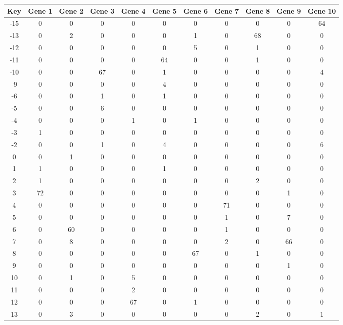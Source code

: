 \begin{tabular}{|c|c|c|c|c|c|c|c|c|c|c|}
\hline
Key & Gene 1 & Gene 2 & Gene 3 & Gene 4 & Gene 5 & Gene 6 & Gene 7 & Gene 8 & Gene 9 & Gene 10 \\
\hline
-15 & 0 & 0 & 0 & 0 & 0 & 0 & 0 & 0 & 0 & 64 \\
-13 & 0 & 2 & 0 & 0 & 0 & 1 & 0 & 68 & 0 & 0 \\
-12 & 0 & 0 & 0 & 0 & 0 & 5 & 0 & 1 & 0 & 0 \\
-11 & 0 & 0 & 0 & 0 & 64 & 0 & 0 & 1 & 0 & 0 \\
-10 & 0 & 0 & 67 & 0 & 1 & 0 & 0 & 0 & 0 & 4 \\
-9 & 0 & 0 & 0 & 0 & 4 & 0 & 0 & 0 & 0 & 0 \\
-6 & 0 & 0 & 1 & 0 & 1 & 0 & 0 & 0 & 0 & 0 \\
-5 & 0 & 0 & 6 & 0 & 0 & 0 & 0 & 0 & 0 & 0 \\
-4 & 0 & 0 & 0 & 1 & 0 & 1 & 0 & 0 & 0 & 0 \\
-3 & 1 & 0 & 0 & 0 & 0 & 0 & 0 & 0 & 0 & 0 \\
-2 & 0 & 0 & 1 & 0 & 4 & 0 & 0 & 0 & 0 & 6 \\
0 & 0 & 1 & 0 & 0 & 0 & 0 & 0 & 0 & 0 & 0 \\
1 & 1 & 0 & 0 & 0 & 1 & 0 & 0 & 0 & 0 & 0 \\
2 & 1 & 0 & 0 & 0 & 0 & 0 & 0 & 2 & 0 & 0 \\
3 & 72 & 0 & 0 & 0 & 0 & 0 & 0 & 0 & 1 & 0 \\
4 & 0 & 0 & 0 & 0 & 0 & 0 & 71 & 0 & 0 & 0 \\
5 & 0 & 0 & 0 & 0 & 0 & 0 & 1 & 0 & 7 & 0 \\
6 & 0 & 60 & 0 & 0 & 0 & 0 & 1 & 0 & 0 & 0 \\
7 & 0 & 8 & 0 & 0 & 0 & 0 & 2 & 0 & 66 & 0 \\
8 & 0 & 0 & 0 & 0 & 0 & 67 & 0 & 1 & 0 & 0 \\
9 & 0 & 0 & 0 & 0 & 0 & 0 & 0 & 0 & 1 & 0 \\
10 & 0 & 1 & 0 & 5 & 0 & 0 & 0 & 0 & 0 & 0 \\
11 & 0 & 0 & 0 & 2 & 0 & 0 & 0 & 0 & 0 & 0 \\
12 & 0 & 0 & 0 & 67 & 0 & 1 & 0 & 0 & 0 & 0 \\
13 & 0 & 3 & 0 & 0 & 0 & 0 & 0 & 2 & 0 & 1 \\
\hline
\end{tabular}